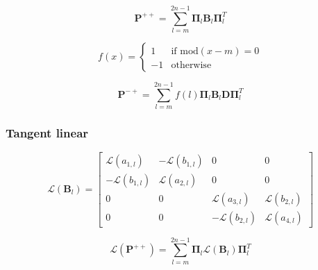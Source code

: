 \begin{equation}
\mathbf{P}^{++} = \sum^{2n - 1}_{l = m}\mathbf{\Pi}_{l}\mathbf{B}_{l}\mathbf{\Pi}^{T}_{l}
\label{eq:phase_matrices-vector-forward-P_pp}
\end{equation}

\begin{equation}
f(x) = \left\{
\begin{array}{ll}
 1 & \mbox{if mod$(x - m) = 0$} \\
-1 & \mbox{otherwise}
\end{array}
\right.
\label{eq:phase_matrices-vector-forward-a}
\end{equation}

\begin{equation}
\mathbf{P}^{-+} = \sum^{2n - 1}_{l = m} f(l)\mathbf{\Pi}_{l}\mathbf{B}_{l}\mathbf{D}\mathbf{\Pi}^{T}_{l}
\label{eq:phase_matrices-vector-forward-P_mp}
\end{equation}


%
\subsubsection{Tangent linear}
\label{sec:phase_matrices-vector-tangent_linear}

\begin{equation}
\mathcal{L}(\mathbf{B}_{l}) =
\left[
\begin{array}{cccc}
 \mathcal{L}(a_{1,l}) & -\mathcal{L}(b_{1,l}) & 0                     & 0  \\
-\mathcal{L}(b_{1,l}) &  \mathcal{L}(a_{2,l}) & 0                     & 0  \\
0                     & 0                     &  \mathcal{L}(a_{3,l}) & \mathcal{L}(b_{2,l})  \\
0                     & 0                     & -\mathcal{L}(b_{2,l}) & \mathcal{L}(a_{4,l})
\end{array}
\right]
\label{eq:phase_matrices-vector-tangent_linear-B_l_l}
\end{equation}

\begin{equation}
\mathcal{L}(\mathbf{P}^{++}) = \sum^{2n - 1}_{l = m} \mathbf{\Pi}_{l}\mathcal{L}(\mathbf{B}_{l})\mathbf{\Pi}^{T}_{l}
\label{eq:phase_matrices-vector-tangent_linear-P_pp_l}
\end{equation}

